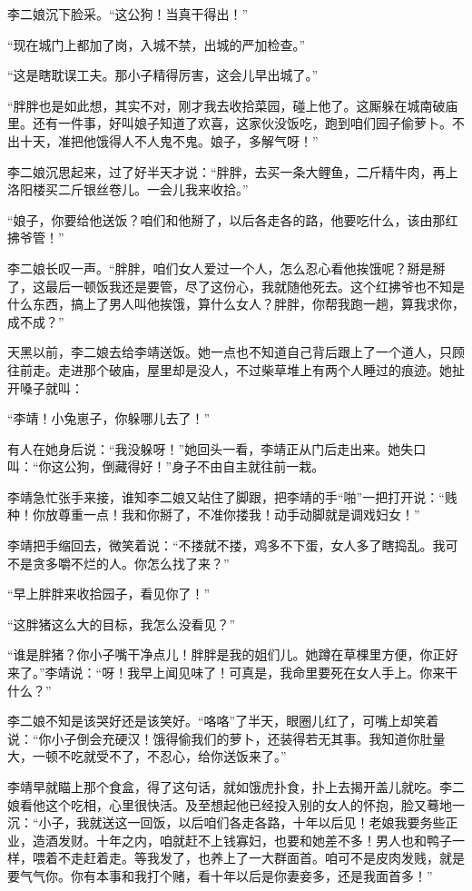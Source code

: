 李二娘沉下脸采。“这公狗！当真干得出！”

“现在城门上都加了岗，入城不禁，出城的严加检查。”

“这是瞎耽误工夫。那小子精得厉害，这会儿早出城了。”

“胖胖也是如此想，其实不对，刚才我去收拾菜园，碰上他了。这厮躲在城南破庙里。还有一件事，好叫娘子知道了欢喜，这家伙没饭吃，跑到咱们园子偷萝卜。不出十天，准把他饿得人不人鬼不鬼。娘子，多解气呀！”

李二娘沉思起来，过了好半天才说：“胖胖，去买一条大鲤鱼，二斤精牛肉，再上洛阳楼买二斤银丝卷儿。一会儿我来收拾。”

“娘子，你要给他送饭？咱们和他掰了，以后各走各的路，他要吃什么，该由那红拂爷管！”

李二娘长叹一声。“胖胖，咱们女人爱过一个人，怎么忍心看他挨饿呢？掰是掰了，这最后一顿饭我还是要管，尽了这份心，我就随他死去。这个红拂爷也不知是什么东西，搞上了男人叫他挨饿，算什么女人？胖胖，你帮我跑一趟，算我求你，成不成？”

天黑以前，李二娘去给李靖送饭。她一点也不知道自己背后跟上了一个道人，只顾往前走。走进那个破庙，屋里却是没人，不过柴草堆上有两个人睡过的痕迹。她扯开嗓子就叫：

“李靖！小兔崽子，你躲哪儿去了！”

有人在她身后说：“我没躲呀！”她回头一看，李靖正从门后走出来。她失口叫：“你这公狗，倒藏得好！”身子不由自主就往前一栽。

李靖急忙张手来接，谁知李二娘又站住了脚跟，把李靖的手“啪”一把打开说：“贱种！你放尊重一点！我和你掰了，不准你搂我！动手动脚就是调戏妇女！”

李靖把手缩回去，微笑着说：“不搂就不搂，鸡多不下蛋，女人多了瞎捣乱。我可不是贪多嚼不烂的人。你怎么找了来？”

“早上胖胖来收拾园子，看见你了！”

“这胖猪这么大的目标，我怎么没看见？”

“谁是胖猪？你小子嘴干净点儿！胖胖是我的姐们儿。她蹲在草棵里方便，你正好来了。”李靖说：“呀！我早上闻见味了！可真是，我命里要死在女人手上。你来干什么？”

李二娘不知是该哭好还是该笑好。“咯咯”了半天，眼圈儿红了，可嘴上却笑着说：“你小子倒会充硬汉！饿得偷我们的萝卜，还装得若无其事。我知道你肚量大，一顿不吃就受不了，不忍心，给你送饭来了。”

李靖早就瞄上那个食盒，得了这句话，就如饿虎扑食，扑上去揭开盖儿就吃。李二娘看他这个吃相，心里很快活。及至想起他已经投入别的女人的怀抱，脸又蓦地一沉：“小子，我就送这一回饭，以后咱们各走各路，十年以后见！老娘我要务些正业，造酒发财。十年之内，咱就赶不上钱寡妇，也要和她差不多！男人也和鸭子一样，喂着不走赶着走。等我发了，也养上了一大群面首。咱可不是皮肉发贱，就是要气气你。你有本事和我打个赌，看十年以后是你妻妾多，还是我面首多！”

